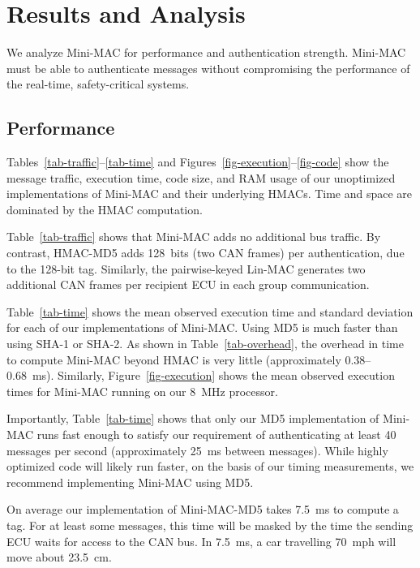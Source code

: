 \section{Results and Analysis}
\label{analysis}

We analyze Mini-MAC for performance and authentication strength. 
Mini-MAC must be able to authenticate messages 
without compromising the performance of the real-time, safety-critical systems.

\subsection{Performance}
\label{performance}

Tables~\ref{tab-traffic}--\ref{tab-time} and Figures~\ref{fig-execution}--\ref{fig-code}
show the message traffic, execution time, code size, and RAM usage of our unoptimized implementations
of Mini-MAC and their underlying HMACs.  Time and space are dominated by the HMAC computation.


Table~\ref{tab-traffic} shows that Mini-MAC adds no additional bus traffic.
By contrast, HMAC-MD5 adds 128~bits (two CAN frames) per authentication,
due to the 128-bit tag.  Similarly, the pairwise-keyed Lin-MAC generates
two additional CAN frames per recipient ECU in each group communication.

Table~\ref{tab-time} shows the mean observed execution time
and standard deviation for each of our implementations of Mini-MAC.
Using MD5 is much faster than using SHA-1 or SHA-2.  As shown in Table~\ref{tab-overhead},
the overhead in time to compute Mini-MAC beyond HMAC is very little (approximately 0.38--0.68~ms).
Similarly, Figure~\ref{fig-execution} shows the mean observed execution times for Mini-MAC 
running on our 8~MHz processor.

Importantly, Table~\ref{tab-time} shows that only our 
MD5 implementation of Mini-MAC runs fast enough to satisfy our
requirement of authenticating at least 40 messages per second (approximately
25~ms between messages).   
While highly optimized code will likely run faster, on the
basis of our timing measurements, we recommend implementing Mini-MAC using MD5.

On average our implementation of Mini-MAC-MD5 takes 7.5~ms to compute a tag.  
For at least some messages, this time will be masked by the time the sending
ECU waits for access to the CAN bus.  In 7.5~ms, a car travelling 70~mph
will move about 23.5~cm.

